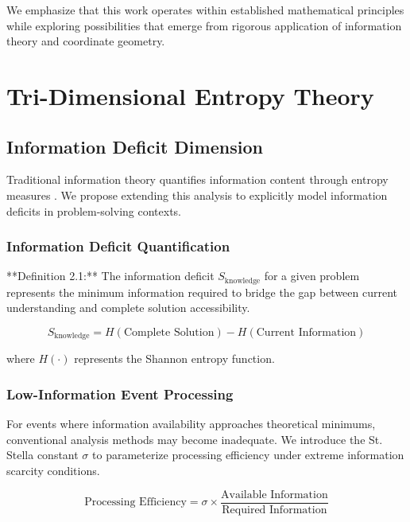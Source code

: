 \documentclass[11pt]{article}
\begin{document}
We emphasize that this work operates within established mathematical principles while exploring possibilities that emerge from rigorous application of information theory and coordinate geometry.

\section{Tri-Dimensional Entropy Theory}

\subsection{Information Deficit Dimension}

Traditional information theory quantifies information content through entropy measures \cite{shannon1948mathematical}. We propose extending this analysis to explicitly model information deficits in problem-solving contexts.

\subsubsection{Information Deficit Quantification}

**Definition 2.1:** The information deficit $S_{\text{knowledge}}$ for a given problem represents the minimum information required to bridge the gap between current understanding and complete solution accessibility.

\begin{equation}
S_{\text{knowledge}} = H(\text{Complete Solution}) - H(\text{Current Information})
\label{eq:information_deficit}
\end{equation}

where $H(\cdot)$ represents the Shannon entropy function.

\subsubsection{Low-Information Event Processing}

For events where information availability approaches theoretical minimums, conventional analysis methods may become inadequate. We introduce the St. Stella constant $\sigma$ to parameterize processing efficiency under extreme information scarcity conditions.

\begin{equation}
\text{Processing Efficiency} = \sigma \times \frac{\text{Available Information}}{\text{Required Information}}
\label{eq:stella_constant}
\end{equation}
\end{document}
